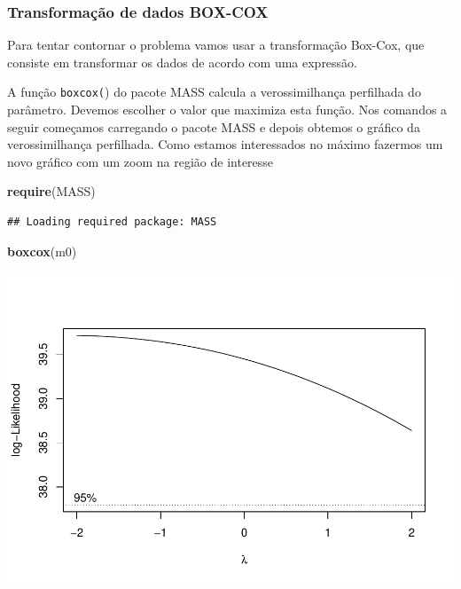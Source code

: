 \documentclass[
]{book}
\newenvironment{Shaded}{\begin{snugshade}}{\end{snugshade}}
\newcommand{\KeywordTok}[1]{\textcolor[rgb]{0.13,0.29,0.53}{\textbf{#1}}}
\newcommand{\NormalTok}[1]{#1}
\newcommand{\OperatorTok}[1]{\textcolor[rgb]{0.81,0.36,0.00}{\textbf{#1}}}
\newcommand{\StringTok}[1]{\textcolor[rgb]{0.31,0.60,0.02}{#1}}
\begin{document}
\begin{Shaded}
\end{Shaded}

\hypertarget{transformauxe7uxe3o-de-dados-box-cox}{%
\subsubsection{Transformação de dados BOX-COX}\label{transformauxe7uxe3o-de-dados-box-cox}}

Para tentar contornar o problema vamos usar a transformação Box-Cox, que consiste em transformar os dados de acordo com uma expressão.

A função \texttt{boxcox(}) do pacote MASS calcula a verossimilhança perfilhada do parâmetro. Devemos escolher o valor que maximiza esta função. Nos comandos a seguir começamos carregando o pacote MASS e depois obtemos o gráfico da verossimilhança perfilhada. Como estamos interessados no máximo fazermos um novo gráfico com um zoom na região de interesse

\begin{Shaded}
\begin{Highlighting}[]
\KeywordTok{require}\NormalTok{(MASS) }
\end{Highlighting}
\end{Shaded}

\begin{verbatim}
## Loading required package: MASS
\end{verbatim}

\begin{Shaded}
\begin{Highlighting}[]
  \KeywordTok{boxcox}\NormalTok{(m0)}
\end{Highlighting}
\end{Shaded}

\includegraphics{TudodoR_files/figure-latex/unnamed-chunk-291-1.pdf}
\end{document}
